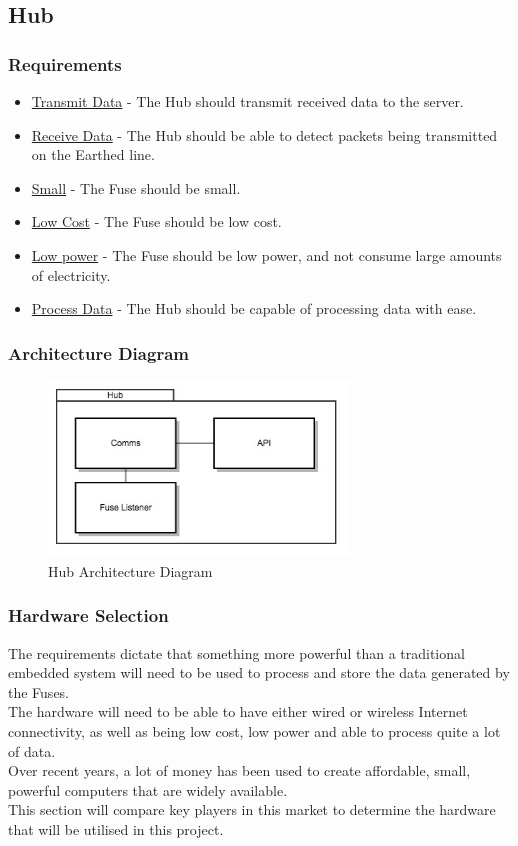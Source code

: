 \documentclass[draft,preprint,12pt,3p]{elsarticle}
\begin{document}
\subsection{Hub}
\subsubsection{Requirements}
\begin{itemize}
\item \underline{Transmit Data} - The Hub should transmit received data to the server.
\item \underline{Receive Data} - The Hub should be able to detect packets being transmitted on the Earthed line.
\item \underline{Small} - The Fuse should be small.
\item \underline{Low Cost} - The Fuse should be low cost.
\item \underline{Low power} - The Fuse should be low power, and not consume large amounts of electricity.
\item \underline{Process Data} - The Hub should be capable of processing data with ease.
\end{itemize}
\subsubsection{Architecture Diagram}
\begin{figure}[H]
    \centering
    \includegraphics[width=8cm]{diagrams/hub}
    \caption {Hub Architecture Diagram}
\end{figure}
\subsubsection{Hardware Selection}
The requirements dictate that something more powerful than a traditional embedded system will need to be used to process and store the data generated by the Fuses.\\
The hardware will need to be able to have either wired or wireless Internet connectivity, as well as being low cost, low power and able to process quite a lot of data.\\
Over recent years, a lot of money has been used to create affordable, small, powerful computers that are widely available.\\
This section will compare key players in this market to determine the hardware that will be utilised in this project.
\end{document}

